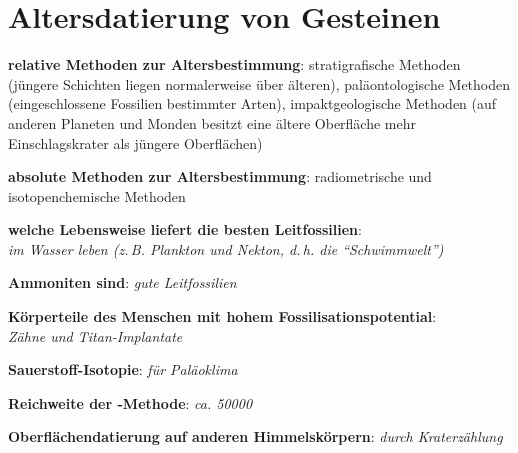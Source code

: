 \pagebreak

\section{%
    Altersdatierung von Gesteinen%
}

\textbf{relative Methoden zur Altersbestimmung}:
stratigrafische Methoden
(jüngere Schichten liegen normalerweise über älteren),
paläontologische Methoden
(eingeschlossene Fossilien bestimmter Arten),
impaktgeologische Methoden
(auf anderen Planeten und Monden besitzt eine ältere Oberfläche mehr Einschlagskrater
als jüngere Oberflächen)

\textbf{absolute Methoden zur Altersbestimmung}:
radiometrische und isotopenchemische Methoden

\begin{wichtig}
    \item
    \textbf{welche Lebensweise liefert die besten Leitfossilien}:\\
    \emph{im Wasser leben (z.\,B. Plankton und Nekton, d.\,h. die "`Schwimmwelt"')}

    \item
    \textbf{Ammoniten sind}:
    \emph{gute Leitfossilien}

    \item
    \textbf{Körperteile des Menschen mit hohem Fossilisationspotential}:\\
    \emph{Zähne und Titan-Implantate}

    \item
    \textbf{Sauerstoff-Isotopie}:
    \emph{für Paläoklima}

    \item
    \textbf{Reichweite der -Methode}:
    \emph{ca. \SI[math-rm=\mathit,text-rm=\itshape]{50000}{\year}}

    \item
    \textbf{Oberflächendatierung auf anderen Himmelskörpern}:
    \emph{durch Kraterzählung}
\end{wichtig}

\pagebreak
